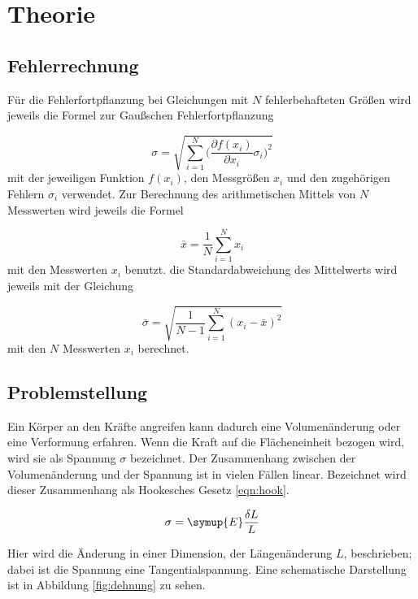 \section{Theorie}
\label{sec:Theorie}

\subsection{Fehlerrechnung}

Für die Fehlerfortpflanzung bei Gleichungen mit $N$ fehlerbehafteten Größen
wird jeweils die Formel zur Gaußschen Fehlerfortpflanzung

\begin{equation}
  \sigma = \sqrt{\sum_{i=1}^{N}\biggl(\frac{\partial f(x_i)}{\partial x_i}
  \sigma_i\biggr)^2}
\end{equation}
mit der jeweiligen Funktion $f(x_i)$, den Messgrößen $x_i$ und den
zugehörigen Fehlern $\sigma_i$ verwendet.
Zur Berechnung des arithmetischen Mittels von $N$ Messwerten wird jeweils die
Formel

\begin{equation}
  \bar{x} = \frac{1}{N}\sum_{i=1}^{N}x_i
\end{equation}
mit den Messwerten $x_i$ benutzt.
die Standardabweichung des Mittelwerts wird jeweils mit der Gleichung

\begin{equation}
  \bar{\sigma} = \sqrt{\frac{1}{N-1}\sum_{i=1}^{N}(x_i - \bar{x})^2}
\end{equation}
mit den $N$ Messwerten $x_i$ berechnet.

\subsection{Problemstellung}

Ein Körper an den Kräfte angreifen kann dadurch eine Volumenänderung oder eine
Verformung erfahren. Wenn die Kraft auf die Flächeneinheit bezogen wird, wird sie
als Spannung $\sigma$ bezeichnet. Der Zusammenhang zwischen der Volumenänderung
und der Spannung ist in vielen Fällen linear. Bezeichnet wird dieser Zusammenhang
als Hookesches Gesetz \eqref{eqn:hook}.

\begin{equation}
  \sigma = \symup{E} \frac{\delta L}{L}
  \label{eqn:hook}
\end{equation}

Hier wird die Änderung in einer Dimension, der Längenänderung $L$, beschrieben;
dabei ist die Spannung eine Tangentialspannung. Eine schematische Darstellung ist
in Abbildung \ref{fig:dehnung} zu sehen.

